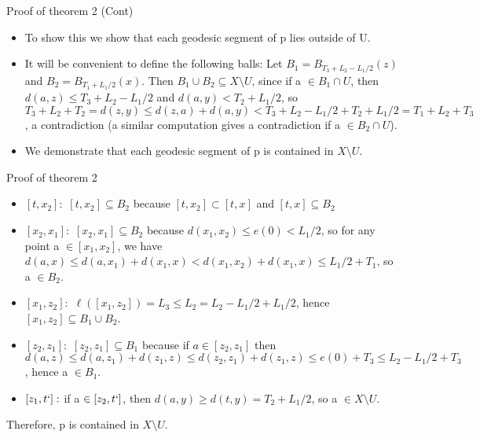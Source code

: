 \documentclass[11pt]{beamer}
\begin{document}
	\begin{frame}{Proof of theorem 2 (Cont)}
		
		\begin{itemize}
			
			\item To show this we show that each geodesic segment of p lies outside of U. 
			\item It will be convenient to define the following balls: Let $B_1 = B_{
				T_3 + L_2 - L_1/2}(z)$ and $B_2 = B_{T_1 + L_1/2}(x)$. Then $B_1 \cup B_2 \subseteq X \setminus U$, since if a $\in B_1 \cap U$, then $d(a, z) \leq T_3 + L_2 - L_1/2$ and $d(a, y) < T_2 + L_1/2$, so $T_3 + L_2 + T_2 = d(z, y) \leq d(z, a) + d(a,y) < T_3 + L_2 - L_1/2 + T_2 + L_1/2 = T_1 + L_2 + T_3$, a contradiction (a similar computation gives a contradiction if a $\in B_2 \cap U$). 
			\item We demonstrate that each geodesic segment of p is contained in $X \setminus U$. 
			
		\end{itemize}
	
	\end{frame}
	
	\begin{frame}{Proof of theorem 2}
		\begin{itemize}
			\item $[t, x_2]: $ $[t, x_2] \subseteq B_2$ because $[t, x_2] \subset [t,x]$ and $[t,x] \subseteq B_2$
			\item $[x_2, x_1]: $ $[x_2, x_1] \subseteq B_2 $ because $d(x_1, x_2) \leq e(0) < L_1/2$, so for any point a $\in [x_1, x_2]$, we have $d(a, x) \leq d(a, x_1) + d(x_1, x) < d(x_1, x_2) + d(x_1, x) \leq L_1/2 + T_1$, so a $\in B_2$.
			\item $[x_1, z_2]: $ $\ell ([x_1, z_2]) = L_3 \leq L_2 = L_2 - L_1/2 + L_1/2$, hence $[x_1, z_2] \subseteq B_1 \cup B_2$. 
			\item $[z_2, z_1]: $ $[z_2, z_1] \subseteq B_1$ because if $a \in [z_2, z_1]$ then $d(a, z) \leq d(a, z_1) + d(z_1, z) \leq d(z_2, z_1) + d(z_1, z) \leq e(0) + T_3 \leq L_2 - L_1/2 + T_3$, hence a $\in B_1$.
			\item $[z_1, t`]: $ if a $\in [z_2, t`]$, then $d(a, y) \geq d(t, y) = T_2 + L_1/2$, so a $\in X \setminus U$.
		\end{itemize}
		
		Therefore, p is contained in $X \setminus U$. 
		
	\end{frame}
\end{document}
